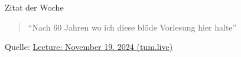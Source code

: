 \documentclass[
  german,            %
  aspectratio=169,    %
]{tumbeamer}
\begin{document}
\begin{frame}[c, fragile]{}{}
  \begin{center}
    \vspace{0.5cm}
    \begin{block}{Zitat der Woche}
      \vspace{0.5cm}
      \begin{quote}
        ``Nach 60 Jahren wo ich diese blöde Vorlesung hier halte''
        \vspace{0.5cm}
      \end{quote}
      \vspace{0.5cm}
    \end{block}
    \vspace{0.5cm}
    Quelle: \href{https://tum.live/w/ws24EidR/50022?t=5533}{Lecture: November 19. 2024 (tum.live)}
\end{center}
\end{frame}
\end{document}
